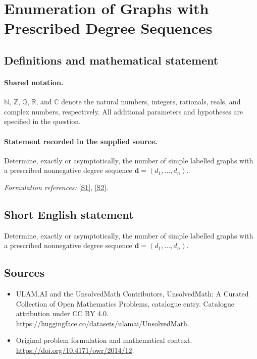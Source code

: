 \documentclass[11pt]{article}
\newcommand{\sref}[2]{\hyperlink{source:#1:#2}{[S#2]}}
\begin{document}
\section{Enumeration of Graphs with Prescribed Degree Sequences}\label{statement}

\subsection{Definitions and mathematical statement}

\paragraph{Shared notation.}$\mathbb N$, $\mathbb Z$, $\mathbb Q$, $\mathbb R$, and $\mathbb C$ denote the natural numbers, integers, rationals, reals, and complex numbers, respectively. All additional parameters and hypotheses are specified in the question.


\paragraph{Statement recorded in the supplied source.}
Determine, exactly or asymptotically, the number of simple labelled graphs with a prescribed nonnegative degree sequence $\mathbf d=(d_1,\ldots,d_n)$.
\par\smallskip\textit{Formulation references:} \sref{statement}{1}, \sref{statement}{2}.
\subsection{Short English statement}
Determine, exactly or asymptotically, the number of simple labelled graphs with a prescribed nonnegative degree sequence $\mathbf d=(d_1,\ldots,d_n)$.
\subsection{Sources}
\begin{itemize}
\item[\hypertarget{source:statement:1}{S1}] ULAM.AI and the UnsolvedMath Contributors, UnsolvedMath: A Curated Collection of Open Mathematics Problems, catalogue entry. Catalogue attribution under CC BY 4.0.
\url{https://huggingface.co/datasets/ulamai/UnsolvedMath}.
\item[\hypertarget{source:statement:2}{S2}] Original problem formulation and mathematical context.
\url{https://doi.org/10.4171/owr/2014/12}.
\end{itemize}
\label{end:statement}
\end{document}
